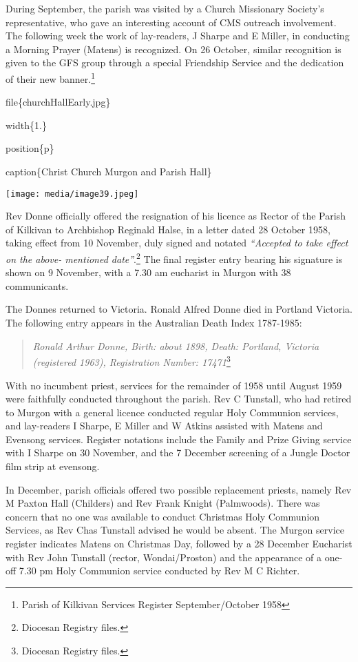 During September, the parish was visited by a Church Missionary Society's representative, who gave an interesting account of CMS outreach involvement. The following week the work of lay-readers, J Sharpe and E Miller, in conducting a Morning Prayer (Matens) is recognized. On 26 October, similar recognition is given to the GFS group through a special Friendship Service and the dedication of their new banner.\footnote{Parish of Kilkivan Services Register September/October 1958}

file\{churchHallEarly.jpg\}

width\{1.\}

position\{p\}

caption\{Christ Church Murgon and Parish Hall\}

\texttt{[image: media/image39.jpeg]}

Rev Donne officially offered the resignation of his licence as Rector of the Parish of Kilkivan to Archbishop Reginald Halse, in a letter dated 28 October 1958, taking effect from 10 November, duly signed and notated \emph{``Accepted to take effect on the above- mentioned date''}.\footnote{Diocesan Registry files.} The final register entry bearing his signature is shown on 9 November, with a 7.30 am eucharist in Murgon with 38 communicants.

The Donnes returned to Victoria. Ronald Alfred Donne died in Portland Victoria. The following entry appears in the Australian Death Index 1787-1985:

\begin{quote}
\emph{Ronald Arthur Donne, Birth: about 1898, Death: Portland, Victoria (registered 1963), Registration Number: 17471}\footnote{Diocesan Registry files.}
\end{quote}

With no incumbent priest, services for the remainder of 1958 until August 1959 were faithfully conducted throughout the parish. Rev C Tunstall, who had retired to Murgon with a general licence conducted regular Holy Communion services, and lay-readers I Sharpe, E Miller and W Atkins assisted with Matens and Evensong services. Register notations include the Family and Prize Giving service with I Sharpe on 30 November, and the 7 December screening of a Jungle Doctor film strip at evensong.

In December, parish officials offered two possible replacement priests, namely Rev M Paxton Hall (Childers) and Rev Frank Knight (Palmwoods). There was concern that no one was available to conduct Christmas Holy Communion Services, as Rev Chas Tunstall advised he would be absent. The Murgon service register indicates Matens on Christmas Day, followed by a 28 December Eucharist with Rev John Tunstall (rector, Wondai/Proston) and the appearance of a one-off 7.30 pm Holy Communion service conducted by Rev M C Richter.

